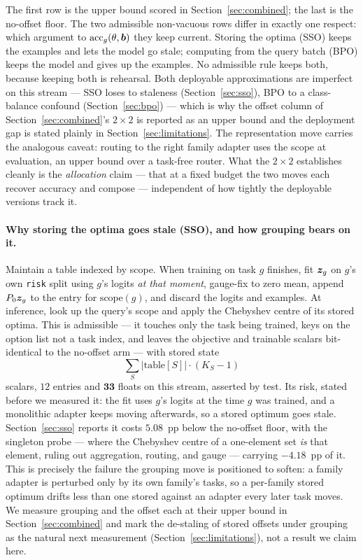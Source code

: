 \noindent The first row is the upper bound scored in Section~\ref{sec:combined};
the last is the no-offset floor. The two admissible non-vacuous rows differ in
exactly one respect: which argument to $\mathrm{acc}_g(\theta,\bm{b})$ they keep
current. Storing the optima (SSO) keeps the examples and lets the model go stale;
computing from the query batch (BPO) keeps the model and gives up the examples. No
admissible rule keeps both, because keeping both is rehearsal. Both deployable
approximations are imperfect on this stream --- SSO loses to staleness
(Section~\ref{sec:sso}), BPO to a class-balance confound
(Section~\ref{sec:bpo}) --- which is why the offset column of
Section~\ref{sec:combined}'s $2\times2$ is reported as an upper bound and the
deployment gap is stated plainly in Section~\ref{sec:limitations}. The
representation move carries the analogous caveat: routing to the right family
adapter uses the scope at evaluation, an upper bound over a task-free router. What
the $2\times2$ establishes cleanly is the \emph{allocation} claim --- that at a
fixed budget the two moves each recover accuracy and compose --- independent of how
tightly the deployable versions track it.

\paragraph{Why storing the optima goes stale (SSO), and how grouping bears on it.}
Maintain a table indexed by scope. When training on task $g$ finishes, fit $\bm{z}_g$
on $g$'s own \texttt{risk} split using $g$'s logits \emph{at that moment},
gauge-fix to zero mean, append $P_0\bm{z}_g$ to the entry for $\mathrm{scope}(g)$, and
discard the logits and examples. At inference, look up the query's scope and apply
the Chebyshev centre of its stored optima. This is admissible --- it touches only
the task being trained, keys on the option list not a task index, and leaves the
objective and trainable scalars bit-identical to the no-offset arm --- with stored
state
\begin{equation}
  \textstyle\sum_S |\mathrm{table}[S]|\cdot(K_S-1)
  \label{eq:cost}
\end{equation}
scalars, $12$ entries and $\mathbf{33}$ floats on this stream, asserted by test.
Its risk, stated before we measured it: the fit uses $g$'s logits at the time $g$
was trained, and a monolithic adapter keeps moving afterwards, so a stored optimum
goes stale. Section~\ref{sec:sso} reports it costs $5.08$~pp below the no-offset
floor, with the singleton probe --- where the Chebyshev centre of a one-element set
\emph{is} that element, ruling out aggregation, routing, and gauge --- carrying
$-4.18$~pp of it. This is precisely the failure the grouping move is positioned to
soften: a family adapter is perturbed only by its own family's tasks, so a
per-family stored optimum drifts less than one stored against an adapter every
later task moves. We measure grouping and the offset each at their upper bound in
Section~\ref{sec:combined} and mark the de-staling of stored offsets under
grouping as the natural next measurement (Section~\ref{sec:limitations}), not a
result we claim here.

